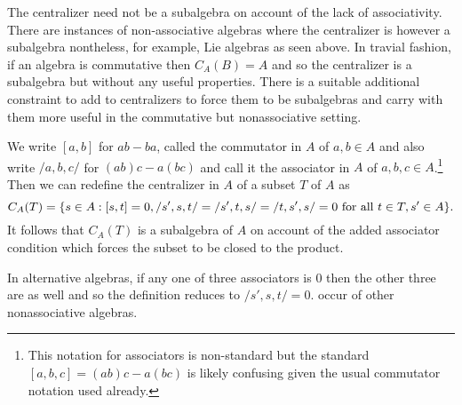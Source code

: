 \documentclass[12pt]{article}
\begin{document}
The centralizer need not be a subalgebra on account of the lack of associativity.
There are instances of non-associative algebras where the centralizer is however
a subalgebra nontheless, for example, Lie algebras as seen above.  In travial fashion, if
an algebra is commutative then $C_A(B)=A$ and so the centralizer is a subalgebra
but without any useful properties.  There is a suitable additional constraint
to add to centralizers to force them to be subalgebras and carry with them
more useful  in the commutative but nonassociative setting.

We write $[a,b]$ for $ab-ba$, called the commutator in $A$ of $a,b\in A$ and also write
$/a,b,c/$ for $(ab)c-a(bc)$ and call it the associator in $A$ of $a,b,c\in A$.\footnote{This notation
for associators is non-standard but the standard $[a,b,c]=(ab)c-a(bc)$ is likely confusing given the 
usual commutator notation used already.}  Then we
can redefine the centralizer in $A$ of a subset $T$ of $A$ as
\begin{equation*}
   C_{A}(T)=\{ s\in A: [s,t]=0, /s',s,t/=/s',t,s/=/t,s',s/=0\textnormal{ for all } t\in T, s'\in A\}.
\end{equation*}
It follows that $C_A(T)$ is a subalgebra of $A$ on account of the added associator condition
which forces the subset to be closed to the product.

In alternative algebras, if any one of three associators is 0 then the other three are as well
and so the definition reduces to $/s',s,t/=0$.   occur of other nonassociative
algebras. 

\end{document}
